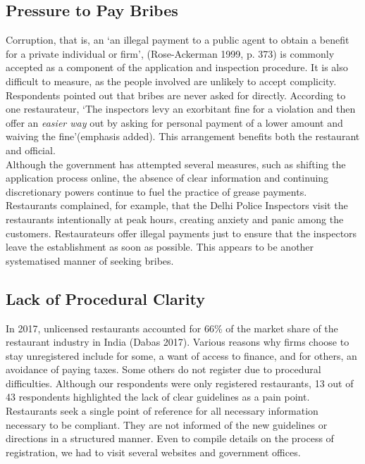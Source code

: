 \documentclass[a4paper, 12pt]{article}
\begin{document}
		\subsection{Pressure to Pay Bribes}
		Corruption, that is, an ‘an illegal payment to a public agent to obtain a benefit for a private individual or firm’, (Rose-Ackerman 1999, p. 373) is commonly accepted as a component of the application and inspection procedure. It is also difficult to measure, 
as the people involved are unlikely to accept complicity. Respondents pointed out that bribes are never asked for directly. According to one restaurateur, ‘The inspectors levy an exorbitant fine for a violation and then offer an \textit{easier way} out by asking for 
personal payment of a lower amount and waiving the fine’(emphasis added). This arrangement benefits both the restaurant and official.\\
		Although the government has attempted several measures, such as shifting the application process online, the absence of clear information and continuing discretionary powers continue to fuel the practice of grease payments. Restaurants complained, 
for example, that the Delhi Police Inspectors visit the restaurants intentionally at peak hours, creating anxiety and panic among the customers. Restaurateurs offer illegal payments just to ensure that the inspectors leave the establishment as soon as possible. This 
appears to be another systematised manner of seeking bribes.
				
		\subsection {Lack of Procedural Clarity}
		In 2017, unlicensed restaurants accounted for 66\% of the market share of the restaurant industry in India (Dabas 2017). Various reasons why firms choose to stay unregistered include for some, a want of access to finance, and for others, an avoidance 
of paying taxes. Some others do not register due to procedural difficulties. Although our respondents were only registered restaurants, 13 out of 43 respondents highlighted the lack of clear guidelines as a pain point. Restaurants seek a single point of reference for 
all necessary information necessary to be compliant. They are not informed of the new guidelines or directions in a structured manner. Even to compile details on the process of registration, we had to visit several websites and government offices.
		
\end{document}
